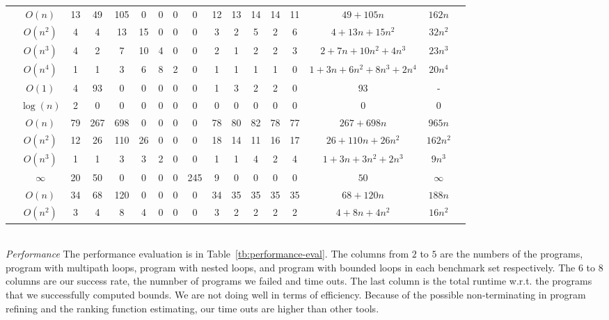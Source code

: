 \begin{table}[ht]
{\begin{tabular}{ >{\scriptsize}c | >{\scriptsize}c | >{\scriptsize}c | >{\scriptsize}c | c | c | c | c | c | c | c | c | c | c | c | c | c |}
 \cline{2-2}
& $O(n)$ & 13 & 49 & 105 & 0 & 0 & 0 & 0 & 12 & 13 & 14 & 14 & 11 & $49 + 105n$ & $162n$\\
 \cline{2-2}
 & $O(n^2)$ & 4 & 4 & 13 & 15 & 0 & 0 & 0 & 3 & 2 & 5 & 2 & 6 & $4 + 13n + 15n^2$ & $32n^2$ \\
 \cline{2-2}
 & $O(n^3)$ & 4 & 2 & 7 & 10 & 4 & 0 & 0 & 2 & 1 & 2 & 2 & 3 & $2 + 7n + 10n^2 + 4n^3 $ & $23n^3$\\
 \cline{2-2}
 & $O(n^{4})$ & 1 & 1 & 3 & 6 & 8 & 2 & 0 & 1 & 1 & 1 & 1 & 0 & $1+3n+6n^2+8n^3+2n^4$ & $20n^4$\\
 \hline \hline
 \multirow{6}{*}{Icra} 
 & $O(1)$ & 4 & 93 & 0 & 0 & 0 & 0 & 0 & 1 & 3 & 2 & 2 & 0 & 93 & - \\
 \cline{2-2}
 & $\log(n)$ & 2 & 0 & 0 & 0 & 0 & 0 & 0 & 0 & 0 & 0 & 0 & 0 & 0 & 0 \\
 \cline{2-2}
 & $O(n)$ & 79 & 267 & 698 & 0 & 0 & 0 & 0 & 78 & 80 & 82 & 78 & 77 & $267 + 698n$ & $ 965n $\\
 \cline{2-2}
 & $O(n^2)$ & 12 & 26 & 110 & 26 & 0 & 0 & 0 & 18 & 14 & 11 & 16 & 17 & $26+110n+26n^2$ & $162n^2$\\
 \cline{2-2}
 & $O(n^3)$ & 1 & 1 & 3 & 3 & 2 & 0 & 0 & 1 & 1 & 4 & 2 & 4 & $1+3n+3n^2+2n^3$ & $9n^3$\\
 \cline{2-2}
 & $\infty$ & 20 &  50 & 0 & 0 & 0 & 0 & 245 & 9 & 0 & 0 & 0 & 0 & $50$ & $ \infty$\\
 \hline \hline
 \multirow{2}{*}{Tianhan} 
 & $O(n)$ & 34 & 68 & 120 & 0 & 0 & 0 & 0 & 34 & 35 & 35 & 35 & 35 & $68+120n$ & $188n$\\
 \cline{2-2}
 & $O(n^2)$ & 3 & 4 & 8 & 4 & 0 & 0 & 0 & 3 & 2 & 2 & 2 & 2 & $4+8n+4n^2$ & $16n^2$ \\
 \hline
 \end{tabular}
 }
 \vspace{-0.5cm}
 \end{table}
%
\\
\emph{Performance}
The performance evaluation is in Table~\ref{tb:performance-eval}.
The columns from $2$ to $5$ are the numbers of the programs, program with multipath loops, program with nested loops, and program with bounded loops in each benchmark set respectively.
The $6$ to $8$ columns are our success rate, the numnber of programs we failed and time outs. The last column is the total runtime w.r.t. the programs that we successfully computed bounds.
We are not doing well in terms of efficiency. Because of the possible non-terminating in program refining and the ranking function estimating, our time outs are higher than other tools.

